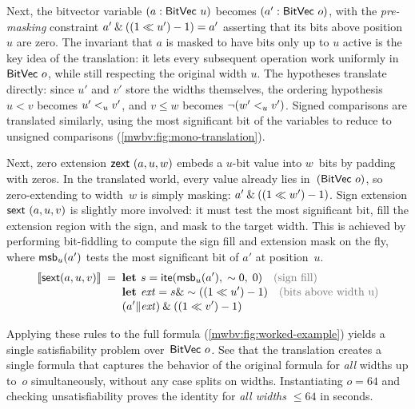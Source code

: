 Next, the bitvector variable $(a : \mathsf{BitVec}~{u})$ becomes $(a' : \mathsf{BitVec}~{o})$, with the
\emph{pre-masking} constraint $a' \mathbin{\&} ((1 \ll u') - 1) = a'$ asserting
that its bits above position~$u$ are zero.
The invariant that $a$ is masked to have bits only up to $u$ active is
the key idea of the translation: it lets every subsequent operation work
uniformly in~$\mathsf{BitVec}~{o}$, while still respecting the original width $u$.
%
The hypotheses translate directly: since $u'$ and $v'$ store the widths
themselves, the ordering hypothesis $u < v$ becomes $u' <_u v'$,
and $v \leq w$ becomes $\neg(w' <_u v')$. Signed comparisons are translated similarly,
using the most significant bit of the variables to reduce to unsigned comparisons (\cref{mwbv:fig:mono-translation}).

Next, zero extension $\mathsf{zext}~(a, u, w)$
embeds a $u$-bit value into $w$~bits by padding with zeros. In the
translated world, every value already lies in~$(\mathsf{BitVec}~{o})$, so zero-extending to
width~$w$ is simply masking: $a' \mathbin{\&} ((1 \ll w') - 1)$. Sign extension
$\mathsf{sext}~(a, u, v)$ is slightly more involved: it must test the most significant
bit, fill the extension region with the sign, and mask to the target width. This
is achieved by performing bit-fiddling to compute the sign fill and extension
mask on the fly, where $\mathsf{msb}_u(a')$ tests the most significant bit of $a'$ at position~$u$.
%
\begin{align*}
  \denote{\mathsf{sext}(a, u, v)} \;=\;\;
  &\textbf{let } s = \mathsf{ite}(\msb_u(a'),\; \bitnot 0,\; 0)
    \quad\text{\dimtext{(sign fill)}} \\[-2pt]
  &\textbf{let } \mathit{ext} = s \bitand \bitnot((1 \bitshl u') - 1)
    \quad\text{\dimtext{(bits above width~u)}} \\[-2pt]
  &(a' \bitor \mathit{ext}) \bitand ((1 \bitshl v') - 1)
\end{align*}

Applying these rules to the full formula
(\cref{mwbv:fig:worked-example}) yields a single \qfbv{}
satisfiability problem over~$\mathsf{BitVec}~{o}$.
See that the translation creates a single formula that captures the behavior of the original formula for \emph{all} widths up to~$o$ simultaneously,
without any case splits on widths.
Instantiating $o = 64$ and checking unsatisfiability proves the identity for
\emph{all widths $\leq 64$} in seconds.


